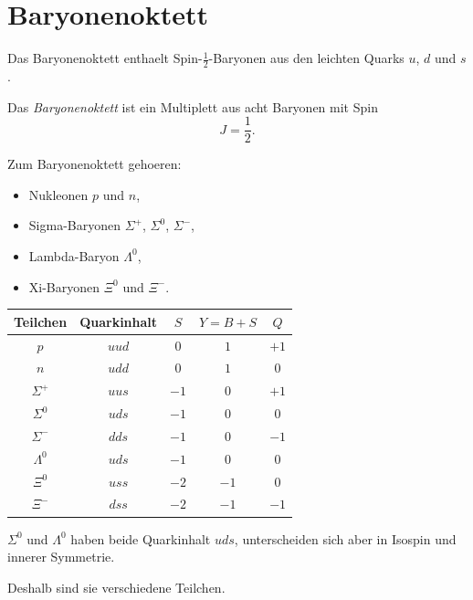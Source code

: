 \section{Baryonenoktett}

Das Baryonenoktett enthaelt Spin-$\frac{1}{2}$-Baryonen aus den leichten Quarks
$u$, $d$ und $s$.

\begin{definitionbox}
Das \emph{Baryonenoktett} ist ein Multiplett aus acht Baryonen mit Spin
\[
    J=\frac{1}{2}.
\]
\end{definitionbox}

\begin{conceptbox}
Zum Baryonenoktett gehoeren:
\begin{itemize}
    \item Nukleonen $p$ und $n$,
    \item Sigma-Baryonen $\Sigma^+$, $\Sigma^0$, $\Sigma^-$,
    \item Lambda-Baryon $\Lambda^0$,
    \item Xi-Baryonen $\Xi^0$ und $\Xi^-$.
\end{itemize}
\end{conceptbox}

\begin{center}
\begin{tabular}{|c|c|c|c|c|}
\hline
Teilchen & Quarkinhalt & $S$ & $Y=B+S$ & $Q$ \\
\hline
$p$ & $uud$ & $0$ & $1$ & $+1$ \\
\hline
$n$ & $udd$ & $0$ & $1$ & $0$ \\
\hline
$\Sigma^+$ & $uus$ & $-1$ & $0$ & $+1$ \\
\hline
$\Sigma^0$ & $uds$ & $-1$ & $0$ & $0$ \\
\hline
$\Sigma^-$ & $dds$ & $-1$ & $0$ & $-1$ \\
\hline
$\Lambda^0$ & $uds$ & $-1$ & $0$ & $0$ \\
\hline
$\Xi^0$ & $uss$ & $-2$ & $-1$ & $0$ \\
\hline
$\Xi^-$ & $dss$ & $-2$ & $-1$ & $-1$ \\
\hline
\end{tabular}
\end{center}

\begin{notebox}
$\Sigma^0$ und $\Lambda^0$ haben beide Quarkinhalt $uds$, unterscheiden sich aber
in Isospin und innerer Symmetrie.

Deshalb sind sie verschiedene Teilchen.
\end{notebox}

